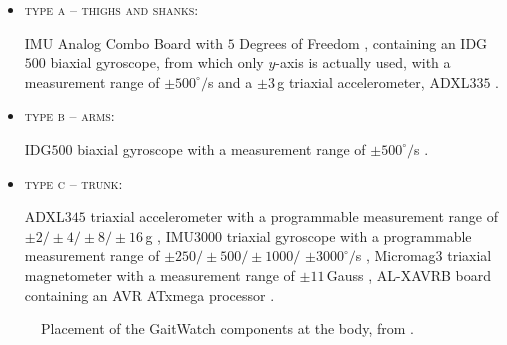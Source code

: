 \begin{itemize}

\item \textsc{type a -- thighs and shanks:} 

IMU Analog Combo Board with $5$ Degrees of Freedom \cite{IMU5}, containing an IDG$500$ biaxial gyroscope, from which only $y$-axis is actually used, with a measurement range of $\pm500^{\circ}/$s \cite{IDG500} and a $\pm3$\,g triaxial accelerometer, ADXL$335$ \cite{ADXL335}.

\item \textsc{type b -- arms:}

IDG$500$ biaxial gyroscope with a measurement range of $\pm500^{\circ}/$s \cite{IDG500}.

\item \textsc{type c -- trunk:}

ADXL$345$ triaxial accelerometer with a programmable measurement range of $\pm 2/\pm 4/\pm 8/\pm 16$\,g \cite{ADXL345},
IMU$3000$ triaxial gyroscope with a programmable measurement range of $\pm250/\pm500/\pm1000/$ $\pm3000^{\circ}/$s \cite{IMU3000}, 
Micromag$3$ triaxial magnetometer with a measurement range of $\pm11$\,Gauss \cite{MicroMag3}, AL-XAVRB board containing an AVR ATxmega processor \cite{AVRATxmega}.

\end{itemize}

\begin{figure}
\centering
{}
\caption{Placement of the GaitWatch components at the body, from \cite{olivares_vicente_gaitwatch_2013}.}
	\label{fig:GaitWatch_placement}
\end{figure}

